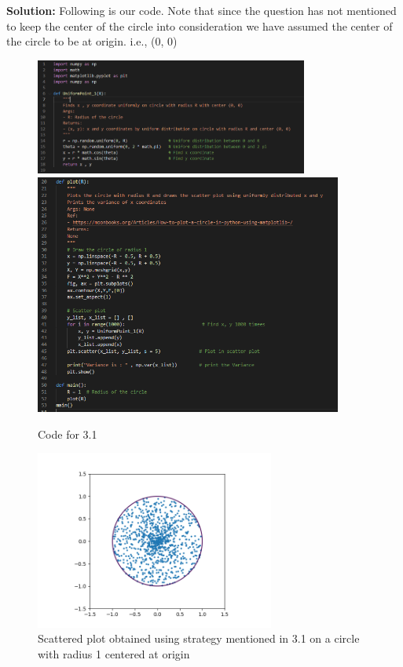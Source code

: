 \documentclass[answers]{exam}
\begin{document}
\begin{framed}
    \textbf{Solution:}
    Following is our code. Note that since the question has not mentioned to keep the center of the circle into consideration we have assumed the center of the circle to be at origin. i.e., (0, 0) 
    
    \begin{figure}[H] %
    \centering
    \includegraphics[width= 0.8\textwidth]{Q3.1_code_1.PNG}
     \includegraphics[width= 0.9\textwidth]{Q3.1_code_2.PNG}
     \caption{Code for 3.1}
    \end{figure}
    
    \begin{figure}[H] %
    \centering
    \includegraphics[width= 0.7\textwidth]{Q3.1_histogram.png}
    \caption{Scattered plot obtained using strategy mentioned in 3.1 on a circle with radius 1 centered at origin}
    \end{figure}
    

\end{framed}
\end{document}
